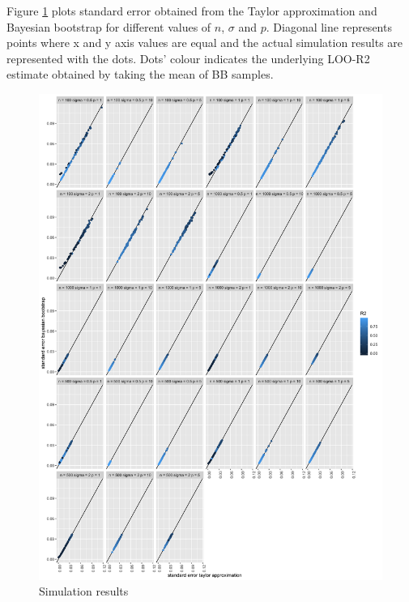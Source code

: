 \documentclass{article}
\begin{document}
Figure \ref{fig:simres} plots standard error obtained from the Taylor approximation and Bayesian bootstrap for different values of $n$, $\sigma$ and $p$. Diagonal line represents points where x and y axis values are equal and the actual simulation results are represented with the dots. Dots' colour indicates the underlying LOO-R2 estimate obtained by taking the mean of BB samples.
\begin{figure}
    \centering
    \includegraphics[width=\textwidth]{simres.png}
    \caption{ Simulation results}
    \label{fig:simres}
\end{figure}

\newpage


\end{document}

